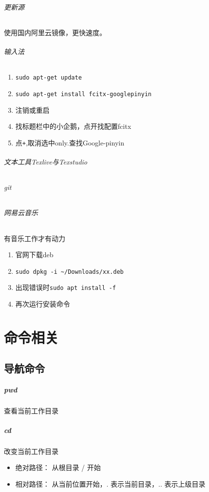\documentclass[UTF8,a4paper,12pt]{ctexbook}
\begin{document}
		\subparagraph{更新源}使用国内阿里云镜像，更快速度。

		\subparagraph{输入法}
			\begin{enumerate}[itemindent = 2em]
				\item \verb|sudo apt-get update|
				\item \verb|sudo apt-get install fcitx-googlepinyin|
				\item 注销或重启
				\item 找标题栏中的小企鹅，点开找配置fcitx
				\item 点\verb|+|,取消选中only.查找Google-pinyin
			\end{enumerate}	
					
		\subparagraph{文本工具Texlive与Texstudio}
		
		\subparagraph{git}	
		
		\subparagraph{网易云音乐}有音乐工作才有动力
			\begin{enumerate}[itemindent = 2em]
				\item 官网下载deb
				\item \verb|sudo dpkg -i ~/Downloads/xx.deb|
				\item 出现错误时\verb|sudo apt install -f|
				\item 再次运行安装命令
			\end{enumerate} 
		
		
 \chapter{命令相关}
	 \section{导航命令}
		 \paragraph{pwd}查看当前工作目录
		 \paragraph{cd}改变当前工作目录
			 \begin{itemize}[itemindent = 1em]
			 	\item 绝对路径： 从根目录 / 开始
			 	\item 相对路径： 从当前位置开始，. 表示当前目录，.. 表示上级目录
			 \end{itemize}
\end{document}
